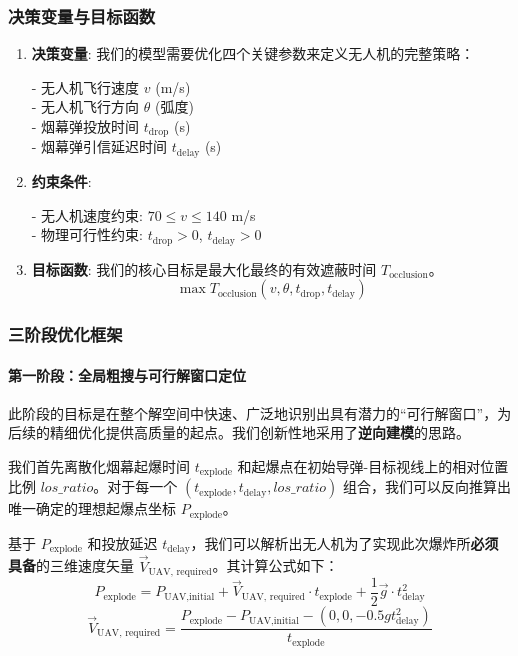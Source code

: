 \documentclass[12pt]{article}
\begin{document}
\begin{CJK}{UTF8}{gbsn}
	\subsubsection{决策变量与目标函数}
	
	\begin{enumerate}
		\item \textbf{决策变量}: 我们的模型需要优化四个关键参数来定义无人机的完整策略：
		
			- 无人机飞行速度 $v$ (m/s)\\
		\indent	- 无人机飞行方向 $\theta$ (弧度)\\
		\indent	- 烟幕弹投放时间 $t_{\text{drop}}$ (s)\\
		\indent	- 烟幕弹引信延迟时间 $t_{\text{delay}}$ (s)

		\item \textbf{约束条件}:

			- 无人机速度约束: $70 \le v \le 140$ m/s\\
		\indent	- 物理可行性约束: $t_{\text{drop}} > 0$, $t_{\text{delay}} > 0$

		
		\item \textbf{目标函数}: 我们的核心目标是最大化最终的有效遮蔽时间 $T_{\text{occlusion}}$。
		\begin{equation}
			\max T_{\text{occlusion}}(v, \theta, t_{\text{drop}}, t_{\text{delay}})
		\end{equation}
	\end{enumerate}
	
	\subsubsection{三阶段优化框架}
	
	\paragraph{第一阶段：全局粗搜与可行解窗口定位}
	此阶段的目标是在整个解空间中快速、广泛地识别出具有潜力的“可行解窗口”，为后续的精细优化提供高质量的起点。我们创新性地采用了\textbf{逆向建模}的思路。
	
	我们首先离散化烟幕起爆时间 $t_{\text{explode}}$ 和起爆点在初始导弹-目标视线上的相对位置比例 $los\_ratio$。对于每一个 $(t_{\text{explode}}, t_{\text{delay}}, los\_ratio)$ 组合，我们可以反向推算出唯一确定的理想起爆点坐标 $P_{\text{explode}}$。
	
	基于 $P_{\text{explode}}$ 和投放延迟 $t_{\text{delay}}$，我们可以解析出无人机为了实现此次爆炸所\textbf{必须具备}的三维速度矢量 $\vec{V}_{\text{UAV, required}}$。其计算公式如下：
	\begin{equation}
		P_{\text{explode}} = P_{\text{UAV,initial}} + \vec{V}_{\text{UAV, required}} \cdot t_{\text{explode}} + \frac{1}{2} \vec{g} \cdot t_{\text{delay}}^2
	\end{equation}
	\begin{equation}
		\vec{V}_{\text{UAV, required}} = \frac{P_{\text{explode}} - P_{\text{UAV,initial}} - (0, 0, -0.5gt_{\text{delay}}^2)}{t_{\text{explode}}}
	\end{equation}
	

\end{CJK}
\end{document}
